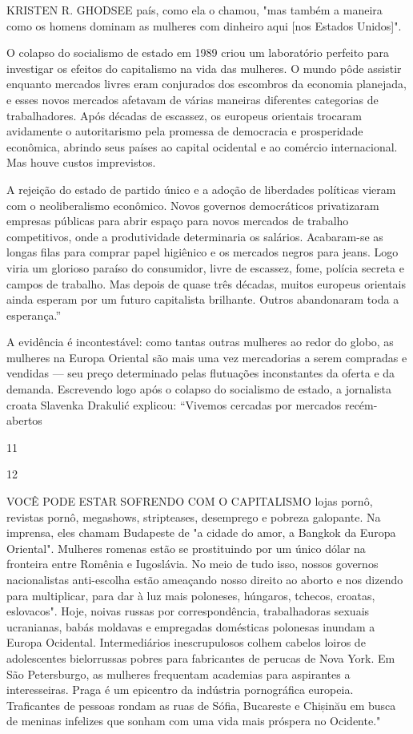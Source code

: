  \par 
KRISTEN R. GHODSEE país, como ela o chamou, "mas também a maneira como os homens dominam as mulheres com dinheiro aqui [nos Estados Unidos]".
 \par 
O colapso do socialismo de estado em 1989 criou um laboratório perfeito para investigar os efeitos do capitalismo na vida das mulheres. O mundo pôde assistir enquanto mercados livres eram conjurados dos escombros da economia planejada, e esses novos mercados afetavam de várias maneiras diferentes categorias de trabalhadores. Após décadas de escassez, os europeus orientais trocaram avidamente o autoritarismo pela promessa de democracia e prosperidade econômica, abrindo seus países ao capital ocidental e ao comércio internacional. Mas houve custos imprevistos.
 \par 
A rejeição do estado de partido único e a adoção de liberdades políticas vieram com o neoliberalismo econômico. Novos governos democráticos privatizaram empresas públicas para abrir espaço para novos mercados de trabalho competitivos, onde a produtividade determinaria os salários. Acabaram-se as longas filas para comprar papel higiênico e os mercados negros para jeans. Logo viria um glorioso paraíso do consumidor, livre de escassez, fome, polícia secreta e campos de trabalho. Mas depois de quase três décadas, muitos europeus orientais ainda esperam por um futuro capitalista brilhante. Outros abandonaram toda a esperança.”
 \par 
A evidência é incontestável: como tantas outras mulheres ao redor do globo, as mulheres na Europa Oriental são mais uma vez mercadorias a serem compradas e vendidas — seu preço determinado pelas flutuações inconstantes da oferta e da demanda. Escrevendo logo após o colapso do socialismo de estado, a jornalista croata Slavenka Drakulić explicou: “Vivemos cercadas por mercados recém-abertos
 \par 
11
 \par 
12
 \par 
VOCÊ PODE ESTAR SOFRENDO COM O CAPITALISMO lojas pornô, revistas pornô, megashows, stripteases, desemprego e pobreza galopante. Na imprensa, eles chamam Budapeste de "a cidade do amor, a Bangkok da Europa Oriental". Mulheres romenas estão se prostituindo por um único dólar na fronteira entre Romênia e Iugoslávia. No meio de tudo isso, nossos governos nacionalistas anti-escolha estão ameaçando nosso direito ao aborto e nos dizendo para multiplicar, para dar à luz mais poloneses, húngaros, tchecos, croatas, eslovacos". Hoje, noivas russas por correspondência, trabalhadoras sexuais ucranianas, babás moldavas e empregadas domésticas polonesas inundam a Europa Ocidental. Intermediários inescrupulosos colhem cabelos loiros de adolescentes bielorrussas pobres para fabricantes de perucas de Nova York. Em São Petersburgo, as mulheres frequentam academias para aspirantes a interesseiras. Praga é um epicentro da indústria pornográfica europeia. Traficantes de pessoas rondam as ruas de Sófia, Bucareste e Chișinău em busca de meninas infelizes que sonham com uma vida mais próspera no Ocidente."

